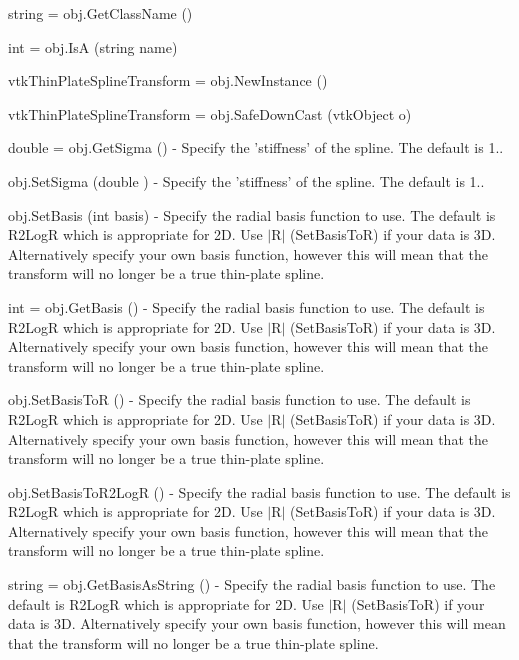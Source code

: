 \begin{DoxyItemize}
\item {\ttfamily string = obj.\-Get\-Class\-Name ()}  
\item {\ttfamily int = obj.\-Is\-A (string name)}  
\item {\ttfamily vtk\-Thin\-Plate\-Spline\-Transform = obj.\-New\-Instance ()}  
\item {\ttfamily vtk\-Thin\-Plate\-Spline\-Transform = obj.\-Safe\-Down\-Cast (vtk\-Object o)}  
\item {\ttfamily double = obj.\-Get\-Sigma ()} -\/ Specify the 'stiffness' of the spline. The default is 1..  
\item {\ttfamily obj.\-Set\-Sigma (double )} -\/ Specify the 'stiffness' of the spline. The default is 1..  
\item {\ttfamily obj.\-Set\-Basis (int basis)} -\/ Specify the radial basis function to use. The default is R2\-Log\-R which is appropriate for 2\-D. Use $|$\-R$|$ (Set\-Basis\-To\-R) if your data is 3\-D. Alternatively specify your own basis function, however this will mean that the transform will no longer be a true thin-\/plate spline.  
\item {\ttfamily int = obj.\-Get\-Basis ()} -\/ Specify the radial basis function to use. The default is R2\-Log\-R which is appropriate for 2\-D. Use $|$\-R$|$ (Set\-Basis\-To\-R) if your data is 3\-D. Alternatively specify your own basis function, however this will mean that the transform will no longer be a true thin-\/plate spline.  
\item {\ttfamily obj.\-Set\-Basis\-To\-R ()} -\/ Specify the radial basis function to use. The default is R2\-Log\-R which is appropriate for 2\-D. Use $|$\-R$|$ (Set\-Basis\-To\-R) if your data is 3\-D. Alternatively specify your own basis function, however this will mean that the transform will no longer be a true thin-\/plate spline.  
\item {\ttfamily obj.\-Set\-Basis\-To\-R2\-Log\-R ()} -\/ Specify the radial basis function to use. The default is R2\-Log\-R which is appropriate for 2\-D. Use $|$\-R$|$ (Set\-Basis\-To\-R) if your data is 3\-D. Alternatively specify your own basis function, however this will mean that the transform will no longer be a true thin-\/plate spline.  
\item {\ttfamily string = obj.\-Get\-Basis\-As\-String ()} -\/ Specify the radial basis function to use. The default is R2\-Log\-R which is appropriate for 2\-D. Use $|$\-R$|$ (Set\-Basis\-To\-R) if your data is 3\-D. Alternatively specify your own basis function, however this will mean that the transform will no longer be a true thin-\/plate spline.  

\end{DoxyItemize}
